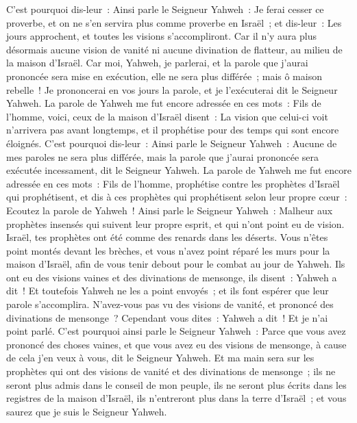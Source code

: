 \begin{multicols}{2}
C'est pourquoi dis-leur~: Ainsi parle le Seigneur Yahweh~: Je ferai cesser ce proverbe, et on ne s'en servira plus comme proverbe en Israël~; et dis-leur~: Les jours approchent, et toutes les visions s'accompliront.
Car il n'y aura plus désormais aucune vision de vanité ni aucune divination de flatteur, au milieu de la maison d'Israël.
Car moi, Yahweh, je parlerai, et la parole que j'aurai prononcée sera mise en exécution, elle ne sera plus différée~; mais ô maison rebelle~! Je prononcerai en vos jours la parole, et je l'exécuterai dit le Seigneur Yahweh.
La parole de Yahweh me fut encore adressée en ces mots~:
Fils de l'homme, voici, ceux de la maison d'Israël disent~: La vision que celui-ci voit n'arrivera pas avant longtemps, et il prophétise pour des temps qui sont encore éloignés.
C'est pourquoi dis-leur~: Ainsi parle le Seigneur Yahweh~: Aucune de mes paroles ne sera plus différée, mais la parole que j'aurai prononcée sera exécutée incessament, dit le Seigneur Yahweh.
\VerseOne{}La parole de Yahweh me fut encore adressée en ces mots~:
Fils de l'homme, prophétise contre les prophètes d'Israël qui prophétisent, et dis à ces prophètes qui prophétisent selon leur propre cœur~: Ecoutez la parole de Yahweh~!
Ainsi parle le Seigneur Yahweh~: Malheur aux prophètes insensés qui suivent leur propre esprit, et qui n'ont point eu de vision.
Israël, tes prophètes ont été comme des renards dans les déserts.
Vous n'êtes point montés devant les brèches, et vous n'avez point réparé les murs pour la maison d'Israël, afin de vous tenir debout pour le combat au jour de Yahweh.
Ils ont eu des visions vaines et des divinations de mensonge, ils disent~: Yahweh a dit~! Et toutefois Yahweh ne les a point envoyés~; et ils font espérer que leur parole s'accomplira.
N'avez-vous pas vu des visions de vanité, et prononcé des divinations de mensonge~? Cependant vous dites~: Yahweh a dit~! Et je n'ai point parlé.
C'est pourquoi ainsi parle le Seigneur Yahweh~: Parce que vous avez prononcé des choses vaines, et que vous avez eu des visions de mensonge, à cause de cela j'en veux à vous, dit le Seigneur Yahweh.
Et ma main sera sur les prophètes qui ont des visions de vanité et des divinations de mensonge~; ils ne seront plus admis dans le conseil de mon peuple, ils ne seront plus écrits dans les registres de la maison d'Israël, ils n'entreront plus dans la terre d'Israël~; et vous saurez que je suis le Seigneur Yahweh.

\end{multicols}
